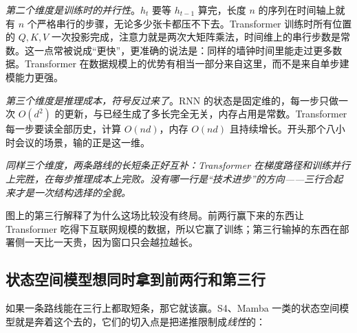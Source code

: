 \emph{第二个维度是训练时的并行性}。\(h_t\) 要等 \(h_{t-1}\) 算完，长度 \(n\) 的序列在时间轴上就有 \(n\) 个严格串行的步骤，无论多少张卡都压不下去。Transformer 训练时所有位置的 \(Q,K,V\) 一次投影完成，注意力就是两次大矩阵乘法，时间维上的串行步数是常数。这一点常被说成``更快''，更准确的说法是：同样的墙钟时间里能走过更多数据。Transformer 在数据规模上的优势有相当一部分来自这里，而不是来自单步建模能力更强。

\emph{第三个维度是推理成本，符号反过来了}。RNN 的状态是固定维的，每一步只做一次 \(O(d^2)\) 的更新，与已经生成了多长完全无关，内存占用是常数。Transformer 每一步要读全部历史，计算 \(O(nd)\)，内存 \(O(nd)\) 且持续增长。开头那个八小时会议的场景，输的正是这一维。

\begin{center}
\end{center}

\emph{同样三个维度，两条路线的长短条正好互补：Transformer 在梯度路径和训练并行上完胜，在每步推理成本上完败。没有哪一行是``技术进步''的方向——三行合起来才是一次结构选择的全貌。}

图上的第三行解释了为什么这场比较没有终局。前两行赢下来的东西让 Transformer 吃得下互联网规模的数据，所以它赢了训练；第三行输掉的东西在部署侧一天比一天贵，因为窗口只会越拉越长。

\subsection{状态空间模型想同时拿到前两行和第三行}

如果一条路线能在三行上都取短条，那它就该赢。S4、Mamba 一类的状态空间模型就是奔着这个去的，它们的切入点是把递推限制成\emph{线性}的：

